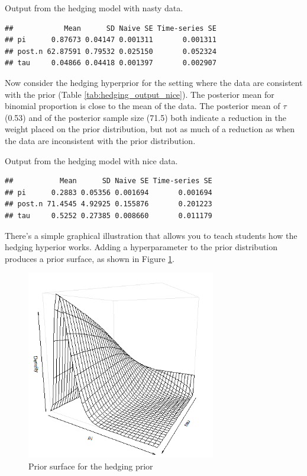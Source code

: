\documentclass[12pt]{article}
\begin{document}
\linespread{1}
\begin{table}
\caption{Output from the hedging model with nasty data.  \label{tab:hedging_output_nasty}}
\begin{verbatim}
##            Mean      SD Naive SE Time-series SE
## pi      0.87673 0.04147 0.001311       0.001311
## post.n 62.87591 0.79532 0.025150       0.052324
## tau     0.04866 0.04418 0.001397       0.002907
\end{verbatim}
\end{table}

Now consider the hedging hyperprior for the setting where the data are consistent with the prior (Table  \ref{tab:hedging_output_nice}). The posterior mean for binomial proportion is close to the mean of the data. The posterior mean of $\tau$ (0.53) and of the posterior sample size (71.5) both indicate a reduction in the weight placed on the prior distribution, but not as much of a reduction as when the data are inconsistent with the prior distribution. 

\linespread{1.6}


\linespread{1}

\begin{table}
\caption{Output from the hedging model with nice data.  \label{tab:hedging_output_nice}}
\begin{verbatim}
##           Mean      SD Naive SE Time-series SE
## pi      0.2883 0.05356 0.001694       0.001694
## post.n 71.4545 4.92925 0.155876       0.201223
## tau     0.5252 0.27385 0.008660       0.011179
\end{verbatim}
\end{table}

\linespread{1.6}

There's a simple graphical illustration that allows you to teach students how the hedging hyperior works. Adding a hyperparameter to the prior distribution produces a prior surface, as shown in Figure \ref{fig:hedging_surface}.

\begin{figure}
\begin{center}
\includegraphics[width=3.25in]{fig3.png}
\end{center}
\caption{Prior surface for the hedging prior \label{fig:hedging_surface}}
\end{figure}
\end{document}
